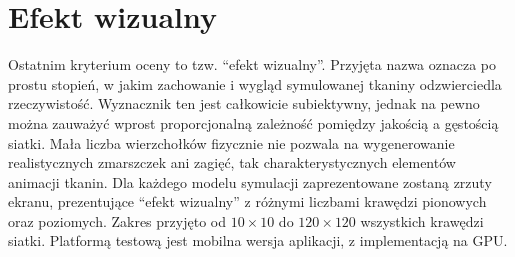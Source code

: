 		
	\section{Efekt wizualny}
	\label{t:wyniki:efektwiz}
		
		Ostatnim kryterium oceny to tzw. ``efekt wizualny''. Przyjęta nazwa oznacza po prostu stopień, w jakim zachowanie i wygląd symulowanej tkaniny odzwierciedla rzeczywistość. Wyznacznik ten jest całkowicie subiektywny, jednak na pewno można zauważyć wprost proporcjonalną zależność pomiędzy jakością a gęstością siatki. Mała liczba wierzchołków fizycznie nie pozwala na wygenerowanie realistycznych zmarszczek ani zagięć, tak charakterystycznych elementów animacji tkanin. Dla każdego modelu symulacji zaprezentowane zostaną zrzuty ekranu, prezentujące ``efekt wizualny'' z różnymi liczbami krawędzi pionowych oraz poziomych. Zakres przyjęto od \(10 \times 10\) do \(120 \times 120\) wszystkich krawędzi siatki. Platformą testową jest mobilna wersja aplikacji, z implementacją na GPU.
		
			
			
			

